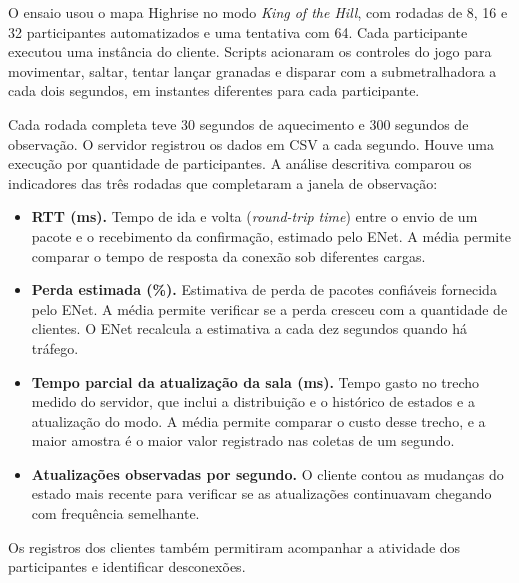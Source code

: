 O ensaio usou o mapa Highrise no modo \textit{King of the Hill}, com rodadas de 8, 16 e 32 participantes automatizados e uma tentativa com 64. Cada participante executou uma instância do cliente. Scripts acionaram os controles do jogo para movimentar, saltar, tentar lançar granadas e disparar com a submetralhadora a cada dois segundos, em instantes diferentes para cada participante.

Cada rodada completa teve 30 segundos de aquecimento e 300 segundos de observação. O servidor registrou os dados em CSV a cada segundo. Houve uma execução por quantidade de participantes. A análise descritiva comparou os indicadores das três rodadas que completaram a janela de observação:

\begin{itemize}
\item \textbf{RTT (ms).} Tempo de ida e volta (\textit{round-trip time}) entre o envio de um pacote e o recebimento da confirmação, estimado pelo ENet. A média permite comparar o tempo de resposta da conexão sob diferentes cargas. \cite{GODOT-ENET-METRICAS}
\item \textbf{Perda estimada (\%).} Estimativa de perda de pacotes confiáveis fornecida pelo ENet. A média permite verificar se a perda cresceu com a quantidade de clientes. O ENet recalcula a estimativa a cada dez segundos quando há tráfego. \cite{GODOT-ENET-METRICAS}
\item \textbf{Tempo parcial da atualização da sala (ms).} Tempo gasto no trecho medido do servidor, que inclui a distribuição e o histórico de estados e a atualização do modo. A média permite comparar o custo desse trecho, e a maior amostra é o maior valor registrado nas coletas de um segundo.
\item \textbf{Atualizações observadas por segundo.} O cliente contou as mudanças do estado mais recente para verificar se as atualizações continuavam chegando com frequência semelhante.
\end{itemize}

Os registros dos clientes também permitiram acompanhar a atividade dos participantes e identificar desconexões.
